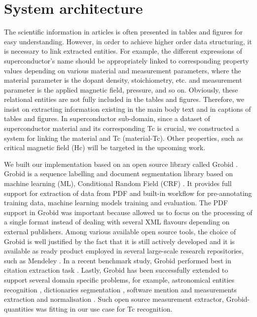 \documentclass{article}[a4]
\begin{document}
\section{System architecture}
\label{sec:architecture}
The scientific information in articles is often presented in tables and figures for easy understanding. However, in order to achieve higher order data structuring, it is necessary to link extracted entities. For example, the different expressions of superconductor’s name should be appropriately linked to corresponding property values depending on various material and measurement parameters, where the material parameter is the dopant density, stoichiometry, etc. and measurement parameter is the applied magnetic field, pressure, and so on. Obviously, these relational entities are not fully included in the tables and figures. Therefore, we insist on extracting information existing in the main body text and in captions of tables and figures. In superconductor sub-domain, since a dataset of superconductor material and its corresponding Tc is crucial, we constructed a system for linking the material and Tc (material-Tc). Other properties, such as critical magnetic field (Hc) will be targeted in the upcoming work.

We built our implementation based on an open source library called Grobid \cite{GROBID}. Grobid is a sequence labelling and document segmentation library based on machine learning (ML), Conditional Random Field (CRF) \cite{lafferty2001conditional}. It provides full support for extraction of data from PDF and built-in workflow for pre-annotating training data, machine learning models training and evaluation. The PDF support in Grobid was important because allowed us to focus on the processing of a single format instead of dealing with several XML flavours depending on external publishers. Among various available open source tools, the choice of Grobid is well justified by the fact that it is still actively developed and it is available as ready product employed in several large-scale research repositories, such as Mendeley \cite{mendeley-extraction}. In a recent benchmark study, Grobid performed best in citation extraction task  \cite{DBLP:journals/corr/abs-1802-01168}. Lastly, Grobid has
been successfully extended to support several domain specific problems, for example, astronomical entities recognition \cite{grobid-astro}, dictionaries segmentation \cite{khemakhem2017automatic}, software mention \cite{software-mentions} and measurements extraction and normalisation \cite{grobid-quantities}. Such open source measurement extractor, Grobid-quantities was fitting in our use case for Tc recognition.
\end{document}

